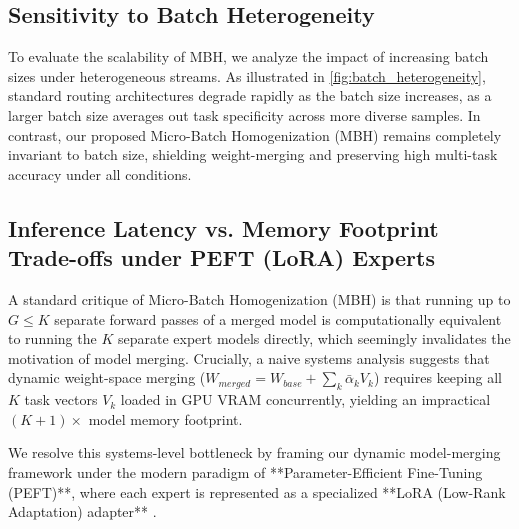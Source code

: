 \subsection{Sensitivity to Batch Heterogeneity}
To evaluate the scalability of MBH, we analyze the impact of increasing batch sizes under heterogeneous streams. As illustrated in \cref{fig:batch_heterogeneity}, standard routing architectures degrade rapidly as the batch size increases, as a larger batch size averages out task specificity across more diverse samples. In contrast, our proposed Micro-Batch Homogenization (MBH) remains completely invariant to batch size, shielding weight-merging and preserving high multi-task accuracy under all conditions.

\subsection{Inference Latency vs. Memory Footprint Trade-offs under PEFT (LoRA) Experts}
A standard critique of Micro-Batch Homogenization (MBH) is that running up to $G \le K$ separate forward passes of a merged model is computationally equivalent to running the $K$ separate expert models directly, which seemingly invalidates the motivation of model merging. Crucially, a naive systems analysis suggests that dynamic weight-space merging ($W_{merged} = W_{base} + \sum_k \bar{\alpha}_k V_k$) requires keeping all $K$ task vectors $V_k$ loaded in GPU VRAM concurrently, yielding an impractical $(K+1)\times$ model memory footprint.

We resolve this systems-level bottleneck by framing our dynamic model-merging framework under the modern paradigm of **Parameter-Efficient Fine-Tuning (PEFT)**, where each expert is represented as a specialized **LoRA (Low-Rank Adaptation) adapter** \cite{Hu2021}. 


